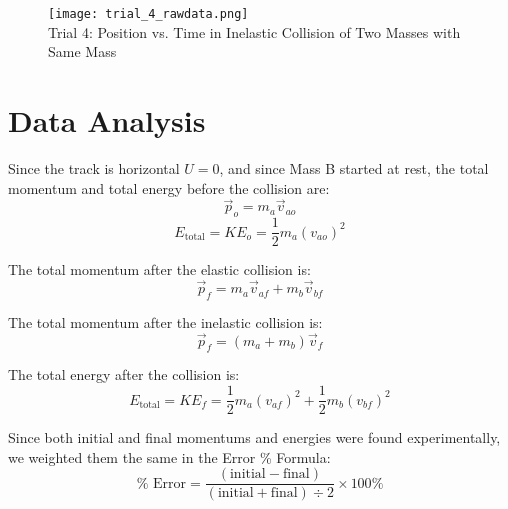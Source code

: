 \documentclass[fleqn]{article}
\begin{document}
\begin{figure}[H]
	\texttt{[image: trial\_4\_rawdata.png]}
	\\Trial 4: Position vs. Time in Inelastic Collision of Two Masses with Same Mass
\end{figure}

\section*{Data Analysis}
Since the track is horizontal $U=0$, and since Mass B started at rest, the total momentum and total energy before the collision are:
\[ \vec{p}_{o}=m_a \vec{v} _{ao}  \]
\[ E _{\text{total} } = KE_o = \frac{1}{2} m_a \left( v _{ao}  \right)^2   \]

The total momentum after the elastic collision is:
\[ \vec{p}_{f}=m_a\vec{v} _{af}+m_b\vec{v} _{bf}    \]

The total momentum after the inelastic collision is:
\[ \vec{p}_{f}= \left( m_a+m_b \right)\vec{v} _f   \]

The total energy after the collision is:
\[ E _{\text{total} } = KE_f=\frac{1}{2} m_a \left( v _{af}  \right)^2 + \frac{1}{2} m_b \left( v _{bf}  \right)^2  \]
\begin{table}[H]
	\centering

\end{table}
Since both initial and final momentums and energies were found experimentally, we weighted them the same in the Error \% Formula:
\[ \% \text{ Error} = \frac{\left( \text{initial} - \text{final}  \right)}{\left( \text{initial} + \text{final}  \right)\div 2} \times 100\%   \]
\end{document}
